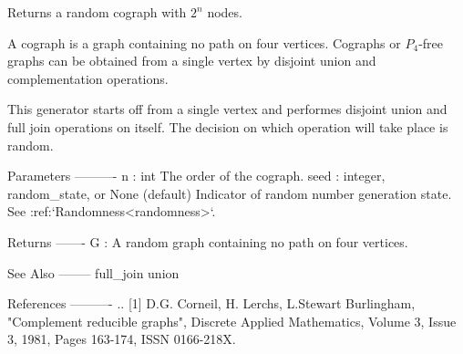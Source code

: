\begin{DoxyVerb}Returns a random cograph with $2 ^ n$ nodes.

A cograph is a graph containing no path on four vertices.
Cographs or $P_4$-free graphs can be obtained from a single vertex
by disjoint union and complementation operations.

This generator starts off from a single vertex and performes disjoint
union and full join operations on itself.
The decision on which operation will take place is random.

Parameters
----------
n : int
        The order of the cograph.
seed : integer, random_state, or None (default)
    Indicator of random number generation state.
    See :ref:`Randomness<randomness>`.

Returns
-------
G : A random graph containing no path on four vertices.

See Also
--------
full_join
union

References
----------
.. [1] D.G. Corneil, H. Lerchs, L.Stewart Burlingham,
   "Complement reducible graphs",
   Discrete Applied Mathematics, Volume 3, Issue 3, 1981, Pages 163-174,
   ISSN 0166-218X.
\end{DoxyVerb}
 